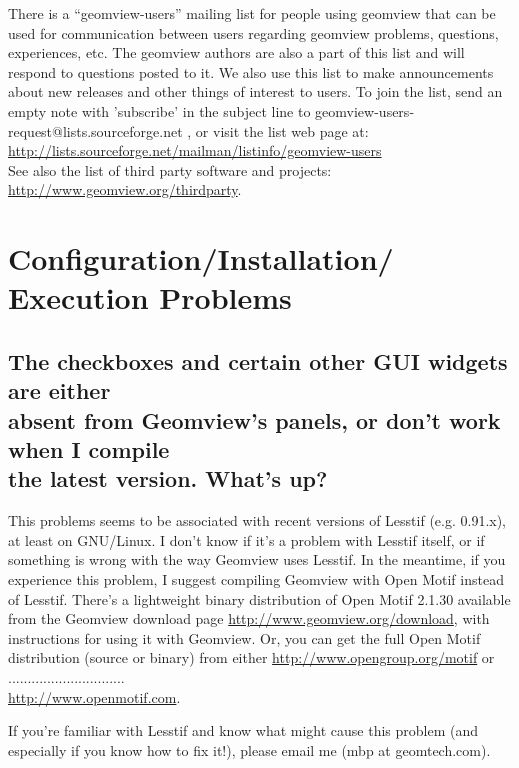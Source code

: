 \documentclass[12pt,a4paper]{article}
\begin{document}
        There is a ``geomview-users'' mailing list for people using geomview that
        can be used for communication between users regarding geomview problems,
        questions, experiences, etc. The geomview authors are also a part of
        this list and will respond to questions posted to it. We also use this
        list to make announcements about new releases and other things of
        interest to users. To join the list, send an empty note with 'subscribe'
        in the subject line to geomview-users-request@lists.sourceforge.net
        , or visit the list web page at:\\
        \url{http://lists.sourceforge.net/mailman/listinfo/geomview-users}
	\\
        See also the list of third party software and projects:\\
        \url{http://www.geomview.org/thirdparty}.

\section{Configuration/Installation/\\ Execution Problems}

    \subsection{The checkboxes and certain other GUI widgets are either \\
    absent from Geomview's panels, or don't work when I compile \\
    the latest version. What's up?}

        This problems seems to be associated with recent versions of Lesstif
        (e.g. 0.91.x), at least on GNU/Linux. I don't know if it's a problem
        with Lesstif itself, or if something is wrong with the way Geomview uses
        Lesstif. In the meantime, if you experience this problem, I suggest
        compiling Geomview with Open Motif instead of Lesstif. There's a
        lightweight binary distribution of Open Motif 2.1.30 available from the
        Geomview download page \url{http://www.geomview.org/download}, with
        instructions for using it with Geomview. Or, you can get the full Open
        Motif distribution (source or binary) from either \url{http://www.opengroup.org/motif}
        or ..............................\\ \url{http://www.openmotif.com}.

        If you're familiar with Lesstif and know what might cause this problem
        (and especially if you know how to fix it!), please email me
        (mbp at geomtech.com).
\end{document}
